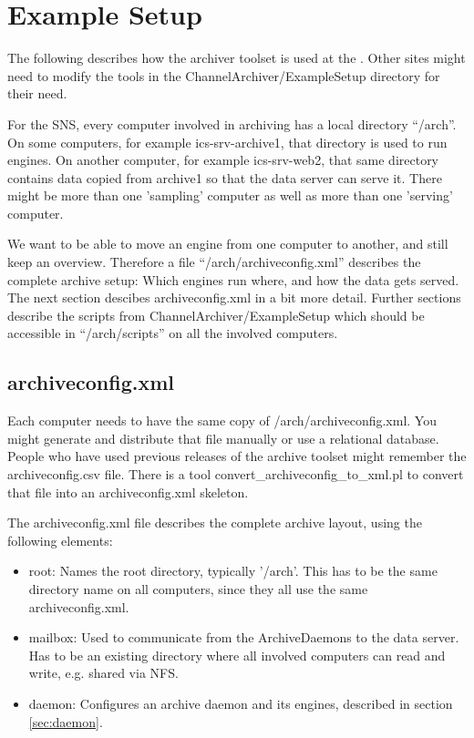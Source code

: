 \chapter{Example Setup} \label{ch:examplesetup}
The following describes how the archiver toolset is used at the
. Other sites might need to
modify the tools in the ChannelArchiver/ExampleSetup directory for their
need.

For the SNS, every computer involved in archiving has a local directory ``/arch''.
On some computers, for example ics-srv-archive1, that directory
is used to run engines.
On another computer, for example ics-srv-web2, that same directory
contains data copied from archive1 so that the data server
can serve it.
There might be more than one 'sampling' computer as well as more
than one 'serving' computer.

We want to be able to move an engine from one computer to another,
and still keep an overview.
Therefore a file ``/arch/archiveconfig.xml'' describes the complete
archive setup: Which engines run where, and how the data gets served.
The next section descibes archiveconfig.xml in a bit more detail.
Further sections describe the scripts from ChannelArchiver/ExampleSetup
which should be accessible in ``/arch/scripts'' on all the involved computers.

\section{archiveconfig.xml}


Each computer needs to have the same copy of /arch/archiveconfig.xml.
You might generate and distribute that file manually
or use a relational database.
People who have used previous releases of the archive toolset might
remember the archiveconfig.csv file. There is a tool
convert\_archiveconfig\_to\_xml.pl to convert that file
into an archiveconfig.xml skeleton.

\clearpage

The archiveconfig.xml file describes the complete archive layout,
using the following elements:
\begin{itemize}
\item root: Names the root directory, typically '/arch'.
      This has to be the same directory name on all computers,
      since they all use the same archiveconfig.xml.
\item mailbox: Used to communicate from the ArchiveDaemons to
      the data server. Has to be an existing directory where
      all involved computers can read and write, e.g.
      shared via NFS.
\item daemon: Configures an archive daemon and its engines,
      described in section \ref{sec:daemon}.
\end{itemize}

